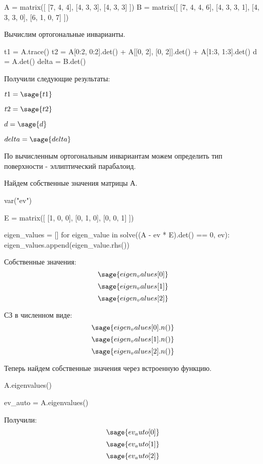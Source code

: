 \documentclass{article}
\begin{document}
\begin{sageblock}
A = matrix([
    [7, 4, 4],
    [4, 3, 3],
    [4, 3, 3]
])
B = matrix([
    [7, 4, 4, 6],
    [4, 3, 3, 1],
    [4, 3, 3, 0],
    [6, 1, 0, 7]
])
\end{sageblock}

Вычислим ортогональные инварианты.

\begin{sageblock}
t1 = A.trace()
t2 = A[0:2, 0:2].det() + A[[0, 2], [0, 2]].det() + A[1:3, 1:3].det()
d = A.det()
delta = B.det()
\end{sageblock}

Получили следующие результаты:

\begin{center}
$t1 = \sage{t1}$

$t2 = \sage{t2}$

$d = \sage{d}$

$delta = \sage{delta}$
\end{center}

По вычисленным ортогональным инвариантам можем определить тип поверхности - эллиптический парабалоид.

Найдем собственные значения матрицы А.

\begin{sagesilent}
var("ev")
\end{sagesilent}

\begin{sageblock}
E = matrix([
    [1, 0, 0],
    [0, 1, 0],
    [0, 0, 1]
])

eigen_values = []
for eigen_value in solve((A - ev * E).det() == 0, ev):
    eigen_values.append(eigen_value.rhs())
\end{sageblock}

Собственные значения:
$$\sage{eigen_values[0]}$$
$$\sage{eigen_values[1]}$$
$$\sage{eigen_values[2]}$$

СЗ в численном виде: 
$$\sage{eigen_values[0].n()}$$
$$\sage{eigen_values[1].n()}$$
$$\sage{eigen_values[2].n()}$$

Теперь найдем собственные значения через встроенную функцию.

\begin{sageblock}
A.eigenvalues()
\end{sageblock}

\begin{sagesilent}
ev_auto = A.eigenvalues()
\end{sagesilent}

Получили: 
$$\sage{ev_auto[0]}$$
$$\sage{ev_auto[1]}$$
$$\sage{ev_auto[2]}$$ 
\end{document}
